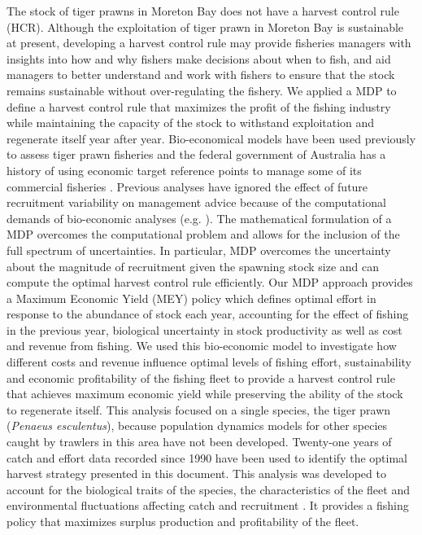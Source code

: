 The stock of tiger prawns in Moreton Bay does not have a harvest control rule (HCR). Although the exploitation of tiger prawn in Moreton Bay is sustainable at present, developing a harvest control rule may provide fisheries managers with insights into how and why fishers make decisions about when to fish, and aid managers to better understand and work with fishers to ensure that the stock remains sustainable without over-regulating the fishery. We applied a MDP to define a harvest control rule that maximizes the profit of the fishing industry while maintaining the capacity of the stock to withstand exploitation and regenerate itself year after year. Bio-economical models have been used previously to assess tiger prawn fisheries and the federal government of Australia has a history of using economic target reference points to manage some of its commercial fisheries \citep{Kompas2010a}. Previous analyses have ignored the effect of future recruitment variability on management advice because of the computational demands of bio-economic analyses (e.g. \cite{punt2010a}). The mathematical formulation of a MDP overcomes the computational problem and allows for the inclusion of the full spectrum of uncertainties. In particular, MDP overcomes the uncertainty about the magnitude of recruitment given the spawning stock size and can compute the optimal harvest control rule efficiently. Our MDP approach provides a Maximum Economic Yield (MEY) policy which defines optimal effort in response to the abundance of stock each year, accounting for the effect of fishing in the previous year, biological uncertainty in stock productivity as well as cost and revenue from fishing. We used this bio-economic model to investigate how different costs and revenue influence optimal levels of fishing effort, sustainability and economic profitability of the fishing fleet to provide a harvest control rule that achieves maximum economic yield while preserving the ability of the stock to regenerate itself. This analysis focused on a single species, the tiger prawn ({\it Penaeus esculentus}), because population dynamics models for other species caught by trawlers in this area have not been developed. Twenty-one years of catch and effort data recorded since 1990 have been used to identify the optimal harvest strategy presented in this document. This analysis was developed to account for the biological traits of the species, the characteristics of the fleet and environmental fluctuations affecting catch and recruitment \citep{KienzleEtAl2015}. It provides a fishing policy that maximizes surplus production and profitability of the fleet.\\

